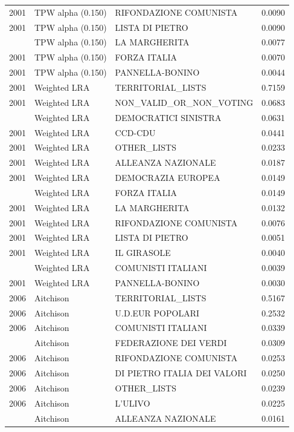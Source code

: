 \begin{longtable}[t]{rllr}
2001 & TPW alpha (0.150) & RIFONDAZIONE COMUNISTA & 0.0090\\
2001 & TPW alpha (0.150) & LISTA DI PIETRO & 0.0090\\
\addlinespace
2001 & TPW alpha (0.150) & LA MARGHERITA & 0.0077\\
2001 & TPW alpha (0.150) & FORZA ITALIA & 0.0070\\
2001 & TPW alpha (0.150) & PANNELLA-BONINO & 0.0044\\
2001 & Weighted LRA & TERRITORIAL\_LISTS & 0.7159\\
2001 & Weighted LRA & NON\_VALID\_OR\_NON\_VOTING & 0.0683\\
\addlinespace
2001 & Weighted LRA & DEMOCRATICI SINISTRA & 0.0631\\
2001 & Weighted LRA & CCD-CDU & 0.0441\\
2001 & Weighted LRA & OTHER\_LISTS & 0.0233\\
2001 & Weighted LRA & ALLEANZA NAZIONALE & 0.0187\\
2001 & Weighted LRA & DEMOCRAZIA EUROPEA & 0.0149\\
\addlinespace
2001 & Weighted LRA & FORZA ITALIA & 0.0149\\
2001 & Weighted LRA & LA MARGHERITA & 0.0132\\
2001 & Weighted LRA & RIFONDAZIONE COMUNISTA & 0.0076\\
2001 & Weighted LRA & LISTA DI PIETRO & 0.0051\\
2001 & Weighted LRA & IL GIRASOLE & 0.0040\\
\addlinespace
2001 & Weighted LRA & COMUNISTI ITALIANI & 0.0039\\
2001 & Weighted LRA & PANNELLA-BONINO & 0.0030\\
2006 & Aitchison & TERRITORIAL\_LISTS & 0.5167\\
2006 & Aitchison & U.D.EUR POPOLARI & 0.2532\\
2006 & Aitchison & COMUNISTI ITALIANI & 0.0339\\
\addlinespace
2006 & Aitchison & FEDERAZIONE DEI VERDI & 0.0309\\
2006 & Aitchison & RIFONDAZIONE COMUNISTA & 0.0253\\
2006 & Aitchison & DI PIETRO ITALIA DEI VALORI & 0.0250\\
2006 & Aitchison & OTHER\_LISTS & 0.0239\\
2006 & Aitchison & L'ULIVO & 0.0225\\
\addlinespace
2006 & Aitchison & ALLEANZA NAZIONALE & 0.0161\\

\end{longtable}
